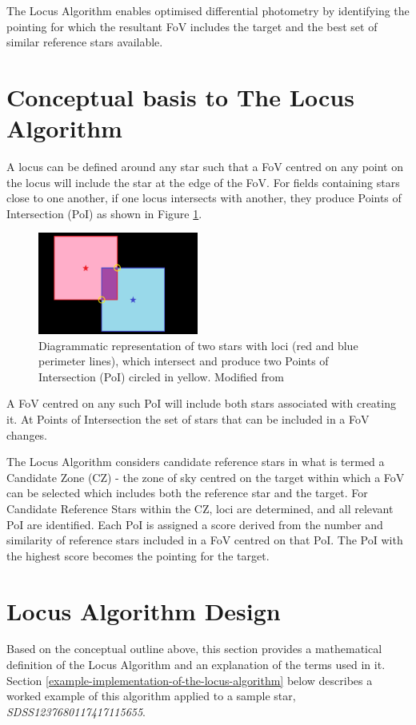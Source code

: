 \documentclass{aa}
\begin{document}
The Locus Algorithm enables optimised differential photometry by
identifying the pointing for which the resultant FoV includes the target
and the best set of similar reference stars available.


\section{Conceptual basis to The Locus Algorithm}
\label{conceptual-basis-to-the-locus-algorithm}

A locus can be defined around any star such that a FoV centred on any
point on the locus will include the star at the edge of the FoV. For
fields containing stars close to one another, if one locus intersects
with another, they produce Points of Intersection (PoI) as shown in Figure \ref{loci_concept}.

\begin{figure}
\centering
\includegraphics[width=0.47\textwidth]{fig1.png}
\caption{\label{loci_concept}Diagrammatic representation of two stars with loci
(red and blue perimeter lines), which intersect and produce two Points
of Intersection (PoI) circled in yellow.  Modified from \citet{creaner2016thesis}}
\end{figure}

A FoV centred on any such PoI will include both stars associated with
creating it. At Points of Intersection the set of stars that can be
included in a FoV changes.

The Locus Algorithm considers candidate reference stars in what is
termed a Candidate Zone (CZ) - the zone of sky centred on the target
within which a FoV can be selected which includes both the reference
star and the target. For Candidate Reference Stars within the CZ, 
loci are determined, and all relevant PoI are identified. Each PoI 
is assigned a score derived from the number and similarity of reference
stars included in a FoV centred on that PoI. The PoI with the highest score 
becomes the pointing for the target.


\section{Locus Algorithm Design}
\label{locus-algorithm-design}
Based on the conceptual outline above, this section provides a mathematical
definition of the Locus Algorithm and an explanation of the terms used in it.
Section \ref{example-implementation-of-the-locus-algorithm} below describes a
 worked example of this algorithm applied to a sample star, \textit{SDSS1237680117417115655}.
\end{document}
